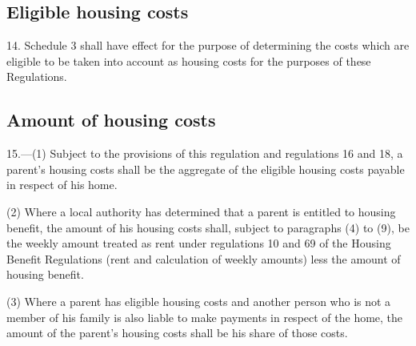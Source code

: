 \documentclass[12pt,a4paper]{article}
\begin{document}

\subsection[14. Eligible housing costs]{Eligible housing costs}

14.  Schedule 3 shall have effect for the purpose of determining the costs which are eligible to be taken into account as housing costs for the purposes of these Regulations.

\subsection[15. Amount of housing costs]{Amount of housing costs}

15.—(1) Subject to the provisions of this regulation and 
regulations 16 and 18,  %
a parent’s housing costs shall be the aggregate of the eligible housing costs payable in respect of his home.

(2) Where a local authority has determined that a parent is entitled to housing benefit, the amount of his housing costs shall, subject to paragraphs (4) to (9), be the weekly amount treated as rent under regulations 10 and 69 of the Housing Benefit Regulations (rent and calculation of weekly amounts) less the amount of housing benefit.

(3) Where a parent has eligible housing costs and another person who is not a member of his family is also liable to make payments in respect of the home, the amount of the parent’s housing costs shall be his share of those costs.
\end{document}
